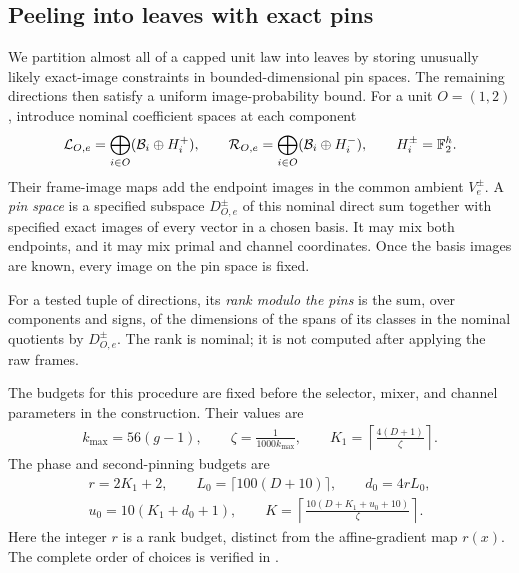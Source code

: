 \subsection{Peeling into leaves with exact pins}

We partition almost all of a capped unit law into leaves by storing
unusually likely exact-image constraints in bounded-dimensional pin spaces.
The remaining directions then satisfy a uniform image-probability bound.
For a unit \(O=(1,2)\), introduce nominal coefficient spaces at each component
\[
 \mathcal L_{O,e}
   =\bigoplus_{i\in O}(\mathcal B_i\oplus H_i^+),
 \qquad
 \mathcal R_{O,e}
   =\bigoplus_{i\in O}(\mathcal B_i\oplus H_i^-),
 \qquad H_i^\pm=\mathbb F_2^h.
\]
Their frame-image maps add the endpoint images in the common ambient \(V_e^\pm\).
A \emph{pin space} is a specified subspace \(D_{O,e}^\pm\) of this nominal direct sum together with specified exact images of every vector in a chosen basis.
It may mix both endpoints, and it may mix primal and channel coordinates.
Once the basis images are known, every image on the pin space is fixed.

For a tested tuple of directions, its \emph{rank modulo the pins} is the sum, over components and signs, of the dimensions of the spans of its classes in the nominal quotients by \(D_{O,e}^\pm\).
The rank is nominal; it is not computed after applying the raw frames.

The budgets for this procedure are fixed before the selector, mixer,
and channel parameters in the construction. Their values are
\begin{equation}\label{eq:pin-budgets}
 \begin{gathered}
 k_{\max}=56(g-1),\qquad
 \zeta=\frac{1}{1000k_{\max}},\qquad
 K_1=\left\lceil\frac{4(D+1)}{\zeta}\right\rceil.
 \end{gathered}
\end{equation}
The phase and second-pinning budgets are
\begin{equation}\label{eq:law-budgets}
 \begin{gathered}
 r=2K_1+2,\qquad L_0=\lceil100(D+10)\rceil,\qquad
 d_0=4rL_0,\\
 u_0=10(K_1+d_0+1),\qquad
 K=\left\lceil\frac{10(D+K_1+u_0+10)}{\zeta}\right\rceil .
 \end{gathered}
\end{equation}
Here the integer \(r\) is a rank budget, distinct from the affine-gradient
map \(r(x)\). The complete order of choices is verified in
.

